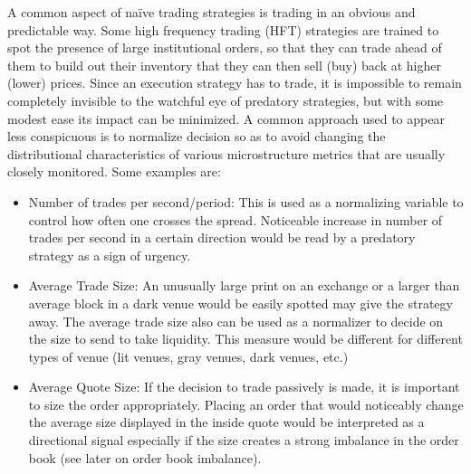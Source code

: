 A common aspect of na\"ive trading strategies is trading in an obvious and predictable way. Some high frequency trading (HFT) strategies are trained to spot the presence of large institutional orders, so that they can trade ahead of them to build out their inventory that they can then sell (buy) back at higher (lower) prices. Since an execution strategy has to trade, it is impossible to remain completely invisible to the watchful eye of predatory strategies, but with some modest ease its impact can be minimized. A common approach used to appear less conspicuous is to normalize decision so as to avoid changing the distributional characteristics of various microstructure metrics that are usually closely monitored. Some examples are:
        \begin{itemize}
        	\item Number of trades per second/period: This is used as a normalizing variable to control how often one crosses the spread. Noticeable increase in number of trades per second in a certain direction would be read by a predatory strategy as a sign of urgency.
        	\item Average Trade Size: An unusually large print on an exchange or a larger than average block in a dark venue would be easily spotted may give the strategy away. The average trade size also can be used as a normalizer to decide on the size to send to take liquidity.  This measure would be different for different types of venue (lit venues, gray venues, dark venues, etc.)
        	\item Average Quote Size: If the decision to trade passively is made, it is important to size the order appropriately. Placing an order that would noticeably change the average size displayed in the inside quote would be interpreted as a directional signal especially if the size creates a strong imbalance in the order book (see later on order book imbalance).
        \end{itemize}


